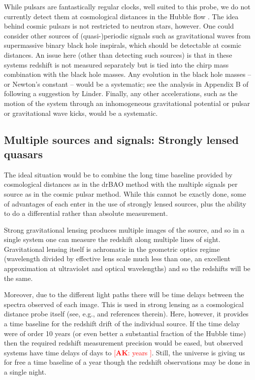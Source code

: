 \documentclass[preprint2, 10pt]{aastex}
\newcommand{\alex}[1]{\textcolor{red}{[{\bf AK}: #1]}}
\begin{document}
While pulsars are fantastically regular clocks, well suited to this probe, 
we do not currently detect them at cosmological distances in the Hubble 
flow \citep[but see][]{13071628}.  The idea behind cosmic pulsars is not 
restricted to neutron stars, however.  
One could consider other sources of (quasi-)periodic signals such as 
gravitational waves from supermassive binary black hole inspirals, which 
should be detectable 
at cosmic distances.  An issue here (other than detecting such sources) 
is that in these systems redshift is not measured separately but is tied 
into the chirp mass combination with the black hole masses.  Any evolution 
in the black hole masses -- or Newton's constant -- would be a systematic; 
see the analysis in Appendix B of \citet{09122724} following a suggestion 
by Linder.  Finally, any other accelerations, such as the motion of the system 
through an inhomogeneous gravitational potential or pulsar or gravitational 
wave kicks, would be a systematic. 


\subsection{Multiple sources and signals: Strongly lensed quasars} \label{sec:lens} 

The ideal situation would be to combine the long time baseline provided 
by cosmological distances as in the drBAO method with the multiple 
signals per source as in the cosmic pulsar method.  While this cannot be 
exactly done, some of advantages of each enter in the use of strongly 
lensed sources, plus the ability to do a differential rather than absolute 
measurement. 

Strong gravitational lensing produces multiple images of the source, 
and so in a single system one can measure the redshift along multiple 
lines of sight.  Gravitational lensing itself is achromatic in the 
geometric optics regime (wavelength divided by effective lens scale 
much less than one, an excellent approximation at ultraviolet and optical 
wavelengths) 
and so the redshifts will be the same. 

Moreover, due to the different light paths there will be time delays 
between the spectra observed of each image.  This is used in strong 
lensing as a cosmological distance probe itself (see, e.g., \citet{13061272} 
and references therein).  Here, however, it provides a time baseline for 
the redshift drift of the individual source.  If the time delay were of 
order 10 years (or even better a substantial fraction of the Hubble time) 
then the required redshift measurement precision would be eased, but 
observed systems have time delays of days to \alex{years
\citep{2007ApJ...662...62F,2008ApJ...676..761F, 2013ApJ...764..186F}}.  Still, the universe 
is giving us for free a time baseline of a year though the redshift 
observations may be done in a single night.  
\end{document}
